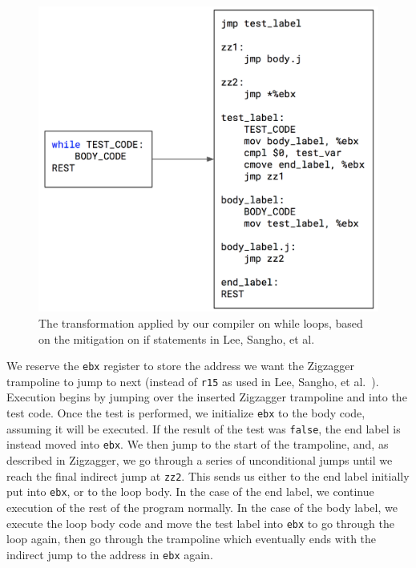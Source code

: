 \documentclass[sigplan, review]{acmart}
\begin{document}
\begin{figure}[bhp]
\includegraphics[width=\columnwidth]{./while_zigzagger.png}
\caption{The transformation applied by our compiler on while loops, based on the mitigation on if statements in Lee, Sangho, et al.}
\label{fig:while_zigzagger}
\end{figure}

We reserve the \texttt{ebx} register to store the address we want the Zigzagger trampoline to jump to next (instead of \texttt{r15} as used in Lee, Sangho, et al.~\cite{lee2016inferring}). Execution begins by jumping over the inserted Zigzagger trampoline and into the test code. Once the test is performed, we initialize \texttt{ebx} to the body code, assuming it will be executed. If the result of the test was \texttt{false}, the end label is instead moved into \texttt{ebx}. We then jump to the start of the trampoline, and, as described in Zigzagger, we go through a series of unconditional jumps until we reach the final indirect jump at \texttt{zz2}. This sends us either to the end label initially put into \texttt{ebx}, or to the loop body. In the case of the end label, we continue execution of the rest of the program normally. In the case of the body label, we execute the loop body code and move the test label into \texttt{ebx} to go through the loop again, then go through the trampoline which eventually ends with the indirect jump to the address in \texttt{ebx} again.
\end{document}
